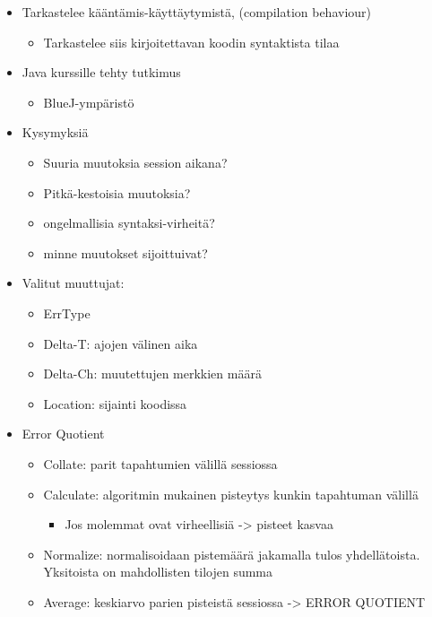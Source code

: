 \begin{itemize}
    \item Tarkastelee kääntämis-käyttäytymistä, (compilation behaviour)
    \begin{itemize}
        \item Tarkastelee siis kirjoitettavan koodin syntaktista tilaa
    \end{itemize}
    \item Java kurssille tehty tutkimus
    \begin{itemize}
        \item BlueJ-ympäristö
    \end{itemize}
    \item Kysymyksiä
    \begin{itemize}
        \item Suuria muutoksia session aikana?
        \item Pitkä-kestoisia muutoksia?
        \item ongelmallisia syntaksi-virheitä?
        \item minne muutokset sijoittuivat?
    \end{itemize}
    \item Valitut muuttujat:
    \begin{itemize}
        \item ErrType
        \item Delta-T: ajojen välinen aika
        \item Delta-Ch: muutettujen merkkien määrä
        \item Location: sijainti koodissa
    \end{itemize}
    \item Error Quotient
    \begin{itemize}
        \item Collate: parit tapahtumien välillä sessiossa
        \item Calculate: algoritmin mukainen pisteytys kunkin tapahtuman välillä
        \begin{itemize}
            \item Jos molemmat ovat virheellisiä -> pisteet kasvaa
        \end{itemize}
        \item Normalize: normalisoidaan pistemäärä jakamalla tulos yhdellätoista. Yksitoista on mahdollisten tilojen summa
        \item Average: keskiarvo parien pisteistä sessiossa -> ERROR QUOTIENT
    \end{itemize}

\end{itemize}
